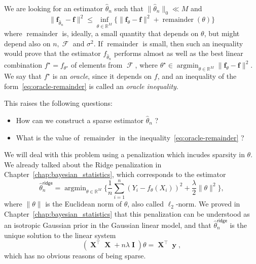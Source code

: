 \documentclass[
	fontsize=11pt, %
	twoside=false, %
	numbers=noenddot, %
]{kaobook}
\DeclareMathOperator{\cF}{{\mathcal F}}
\DeclareMathOperator{\bI}{{\boldsymbol I}}
\DeclareMathOperator{\bX}{{\boldsymbol X}}
\renewcommand{\bf}{{\boldsymbol f}}
\DeclareMathOperator{\by}{{\boldsymbol y}}
\DeclareMathOperator{\remain}{remainder}
\DeclareMathOperator*{\argmin}{argmin}
\newcommand{\R}{\mathbb R}
\newcommand{\wh}{\widehat}
\newcommand{\norm}[1]{\| #1 \|}
\begin{document}
We are looking for an estimator $\wh \theta_n$ such that $\norm{\wh \theta_n}_0 \ll M$ and
\begin{equation}
	\label{eq:oracle-remainder}
	\norm{\bf_{\wh \theta_n} - \bf}^2 \leq \inf_{\theta \in \R^M} \Big\{ 
	\norm{\bf_\theta - \bf}^2 + \remain(\theta) \Big\}
\end{equation}
where $\remain$ is, ideally, a small quantity that depends on $\theta$, but might depend also on $n, \cF$ and $\sigma^2$.
If $\remain$ is small, then such an inequality would prove that the estimator $f_{\wh \theta_n}$ performs almost as well as the best linear combination $f^\star = f_{\theta^\star}$ of elements from $\cF$, where $\theta^\star \in \argmin_{\theta \in \R^M} \norm{\bf_\theta - \bf}^2$.
We say that $f^\star$ is an \emph{oracle}, since it depends on $f$, and an inequality of the form~\eqref{eq:oracle-remainder} is called an \emph{oracle inequality}.

This raises the following questions:
\begin{itemize}
	\item How can we construct a sparse estimator $\wh \theta_n$ ?
	\item What is the value of $\remain$ in the inequality~\eqref{eq:oracle-remainder} ?
\end{itemize}
We will deal with this problem using a penalization which incudes sparsity in $\theta$.
We already talked about the Ridge penalization in Chapter~\ref{chap:bayesian_statistics}, which corresponds to the estimator
\begin{equation}
	\label{eq:chap-lasso-ridge-estimator}
	\wh \theta_n^{\mathsf{ridge}} = \argmin_{\theta \in \R^M} 
	\Big\{ \frac 1n \sum_{i=1}^n (Y_i - f_\theta(X_i))^2 + \frac{\lambda}{2} \norm{\theta}^2 \Big\},
\end{equation}
where $\norm{\theta}$ is the Euclidean norm of $\theta$, also called $\ell_2$-norm.
We proved in Chapter~\ref{chap:bayesian_statistics} that this penalization can be understood as an isotropic Gaussian prior in the Gaussian linear model, and that $\wh \theta_n^{\mathsf{ridge}}$ is the unique solution to the linear system
\begin{equation*}
	(\bX^\top \bX + n \lambda \bI) \theta = \bX^\top \by,
\end{equation*}
which has no obvious reasons of being sparse.
\end{document}
